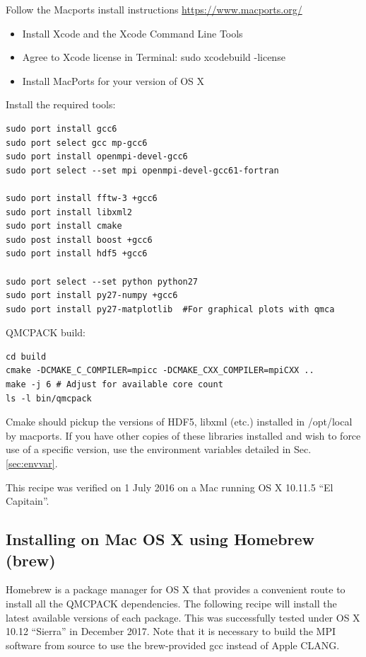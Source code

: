 Follow the Macports install instructions \url{https://www.macports.org/}

\begin{itemize}
\item Install Xcode and the Xcode Command Line Tools
\item Agree to Xcode license in Terminal: sudo xcodebuild -license
\item Install MacPorts for your version of OS X
\end{itemize}


Install the required tools:

\verbatimfont{\footnotesize}
\begin{verbatim}
sudo port install gcc6
sudo port select gcc mp-gcc6
sudo port install openmpi-devel-gcc6
sudo port select --set mpi openmpi-devel-gcc61-fortran

sudo port install fftw-3 +gcc6
sudo port install libxml2
sudo port install cmake
sudo post install boost +gcc6
sudo port install hdf5 +gcc6

sudo port select --set python python27
sudo port install py27-numpy +gcc6
sudo port install py27-matplotlib  #For graphical plots with qmca
\end{verbatim}

QMCPACK build:
\verbatimfont{\footnotesize}
\begin{verbatim}
cd build
cmake -DCMAKE_C_COMPILER=mpicc -DCMAKE_CXX_COMPILER=mpiCXX ..
make -j 6 # Adjust for available core count
ls -l bin/qmcpack
\end{verbatim}

Cmake should pickup the versions of HDF5, libxml (etc.) installed in
/opt/local by macports. If you have other copies of these libraries
installed and wish to force use of a specific version, use the
environment variables detailed in Sec. \ref{sec:envvar}.

This recipe was verified on 1 July 2016 on a Mac running OS X 10.11.5
``El Capitain''.

\subsection{Installing on Mac OS X using Homebrew (brew)}
Homebrew is a package manager for OS X that provides a convenient
route to install all the QMCPACK dependencies. The
following recipe will install the latest available versions of each
package. This was successfully tested under OS X 10.12 ``Sierra'' in December 2017. Note that it is necessary to build the MPI software from
source to use the brew-provided gcc instead of Apple CLANG.

